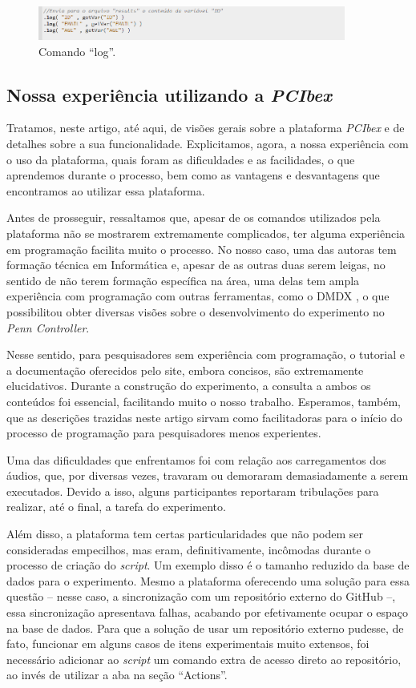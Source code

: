 \documentclass{textolivre}
\begin{document}
\begin{figure}[htbp]
 \centering
 \includegraphics[width=0.9\textwidth]{fig-017.png}
 \caption{Comando “log”.}
 \label{fig17}
\end{figure}

\subsection{Nossa experiência utilizando a \emph{PCIbex}}
Tratamos, neste artigo, até aqui, de visões gerais sobre a plataforma \emph{PCIbex} e de detalhes sobre a sua funcionalidade. Explicitamos, agora, a nossa experiência com o uso da plataforma, quais foram as dificuldades e as facilidades, o que aprendemos durante o processo, bem como as vantagens e desvantagens que encontramos ao utilizar essa plataforma.

Antes de prosseguir, ressaltamos que, apesar de os comandos utilizados pela plataforma não se mostrarem extremamente complicados, ter alguma experiência em programação facilita muito o processo. No nosso caso, uma das autoras tem formação técnica em Informática e, apesar de as outras duas serem leigas, no sentido de não terem formação específica na área, uma delas tem ampla experiência com programação com outras ferramentas, como o DMDX \cite{forster2002}, o que possibilitou obter diversas visões sobre o desenvolvimento do experimento no \emph{Penn Controller}.

Nesse sentido, para pesquisadores sem experiência com programação, o tutorial e a documentação oferecidos pelo site, embora concisos, são extremamente elucidativos. Durante a construção do experimento, a consulta a ambos os conteúdos foi essencial, facilitando muito o nosso trabalho. Esperamos, também, que as descrições trazidas neste artigo sirvam como facilitadoras para o início do processo de programação para pesquisadores menos experientes.

Uma das dificuldades que enfrentamos foi com relação aos carregamentos dos áudios, que, por diversas vezes, travaram ou demoraram demasiadamente a serem executados. Devido a isso, alguns participantes reportaram tribulações para realizar, até o final, a tarefa do experimento.

Além disso, a plataforma tem certas particularidades que não podem ser consideradas empecilhos, mas eram, definitivamente, incômodas durante o processo de criação do \emph{script}. Um exemplo disso é o tamanho reduzido da base de dados para o experimento. Mesmo a plataforma oferecendo uma solução para essa questão – nesse caso, a sincronização com um repositório externo do GitHub –, essa sincronização apresentava falhas, acabando por efetivamente ocupar o espaço na base de dados. Para que a solução de usar um repositório externo pudesse, de fato, funcionar em alguns casos de itens experimentais muito extensos, foi necessário adicionar ao \emph{script} um comando extra de acesso direto ao repositório, ao invés de utilizar a aba na seção “Actions”.
\end{document}
